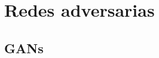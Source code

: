 \documentclass[12pt,openany]{book}
\begin{document}
\chapter{Redes adversarias}
\section{GANs}

\backmatter

\printbibliography[heading=bibintoc]
\end{document}
